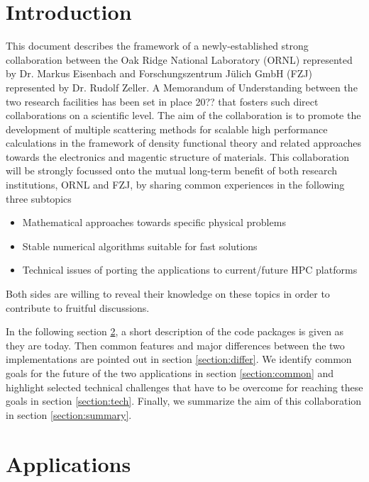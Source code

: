 \documentclass{llncs}
\begin{document}
\section{Introduction} \label{section:intro}
This document describes the framework of a newly-established strong collaboration
between the Oak Ridge National Laboratory (ORNL) represented by Dr. Markus Eisenbach
and Forschungszentrum J\"ulich GmbH (FZJ) represented by Dr. Rudolf Zeller.
A Memorandum of Understanding between the two research facilities has been set in place 20?? 
that fosters such direct collaborations on a scientific level.
The aim of the collaboration is to promote the development of multiple scattering methods
for scalable high performance calculations in the framework of density functional theory
and related approaches towards the electronics and magentic structure of materials.
This collaboration will be strongly focussed onto the mutual long-term benefit of both research institutions, 
ORNL and FZJ, by sharing common experiences in the following three subtopics
\begin{itemize}
 \item Mathematical approaches towards specific physical problems  
 \item Stable numerical algorithms suitable for fast solutions
 \item Technical issues of porting the applications to current/future HPC platforms
\end{itemize}
Both sides are willing to reveal their knowledge on these topics in order to
contribute to fruitful discussions.


In the following section \ref{section:apps}, a short description of the code packages is given as they are today.
Then common features and major differences between the two implementations are pointed out in section \ref{section:differ}.
We identify common goals for the future of the two applications in section \ref{section:common}
and highlight selected technical challenges that have to be overcome for reaching these goals in section \ref{section:tech}.
Finally, we summarize the aim of this collaboration in section \ref{section:summary}.

\section{Applications} \label{section:apps}
\end{document}
